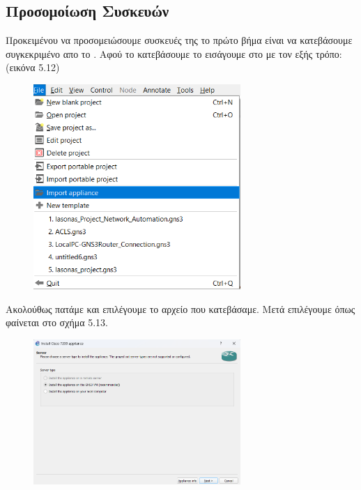 \FloatBarrier





\subsection{Προσομοίωση Συσκευών }

  Προκειμένου να προσομειώσουμε συσκευές της  το πρώτο βήμα είναι να κατεβάσουμε συγκεκριμένο  απο το . Αφού το κατεβάσουμε το εισάγουμε στο  με τον εξής τρόπο: (εικόνα 5.12)

\FloatBarrier

\begin{figure}[htb]
	\centering
	\includegraphics[width=0.7\textwidth]{graphics/import_appliance.png}
	\caption{ }
\end{figure}

\FloatBarrier

\noindent Ακολούθως πατάμε  και επιλέγουμε το αρχείο που κατεβάσαμε.  Μετά επιλέγουμε  όπως φαίνεται στο σχήμα 5.13.

\FloatBarrier

\begin{figure}[htb]
	\centering
	\includegraphics[width=0.7\textwidth]{graphics/install_appliance.png}
	\caption{ }
\end{figure}

